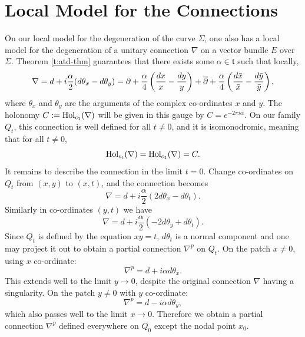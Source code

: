 \section{Local Model for the Connections}
	\label{s:local-model-conns}
	On our local model for the degeneration of the curve $\Sigma$, one also has a local model for the degeneration of a unitary connection $\nabla$ on a vector bundle $E$ over $\Sigma$. Theorem \ref{t:atd-thm} guarantees that there exists some $\alpha \in \mathfrak{t}$ such that locally,
	\begin{equation}
	\nabla = d + i\frac{\alpha}{2}(d\theta_x - d\theta_y) = \partial + \frac{\alpha}{4}\left(\frac{dx}{x}-\frac{dy}{y}\right) + \overline{\partial}+ \frac{\alpha}{4}\left(\frac{d\bar{x}}{\bar{x}}-\frac{d\bar{y}}{\bar{y}}\right),
	\end{equation} 
	where $\theta_x$ and $\theta_y$ are the arguments of the complex co-ordinates $x$ and $y$. The holonomy $C := \text{Hol}_{c_1}(\nabla)$ will be given in this gauge by $C = e^{-2\pi i \alpha}$. On our family $Q_t$, this connection is well defined for all $t\neq 0$, and it is isomonodromic, meaning that for all $t\neq 0$, 
	\begin{equation}
	\text{Hol}_{c_t}(\nabla) = \text{Hol}_{c_1}(\nabla)=C.
	\end{equation}
	It remains to describe the connection in the limit $t=0$. Change co-ordinates on $Q_t$ from $(x,y)$ to $(x,t)$, and the connection becomes
	\begin{equation}
		\nabla = d + i\frac{\alpha}{2}(2d\theta_x - d\theta_t).
	\end{equation}
	Similarly in co-ordinates $(y,t)$ we have
	\begin{equation}
		\nabla = d + i\frac{\alpha}{2}(-2d\theta_y + d\theta_t).
	\end{equation}
	Since $Q_t$ is defined by the equation $xy=t$, $d\theta_t$ is a normal component and one may project it out to obtain a partial connection $\nabla^p$ on $Q_t$. On the patch $x\neq 0$, using $x$ co-ordinate:
	\begin{equation}
		\label{e:dtx}
		\nabla^p = d + i\alpha d\theta_x.
	\end{equation}
	This extends well to the limit $y\to 0$, despite the original connection $\nabla$ having a singularity. On the patch $y\neq 0$ with $y$ co-ordinate:
	\begin{equation}
		\label{e:dty}
		\nabla^p = d - i\alpha d\theta_y,
	\end{equation}
	which also passes well to the limit $x\to 0$. Therefore we obtain a partial connection $\nabla^p$ defined everywhere on $Q_0$ except the nodal point $x_0$. 
	
